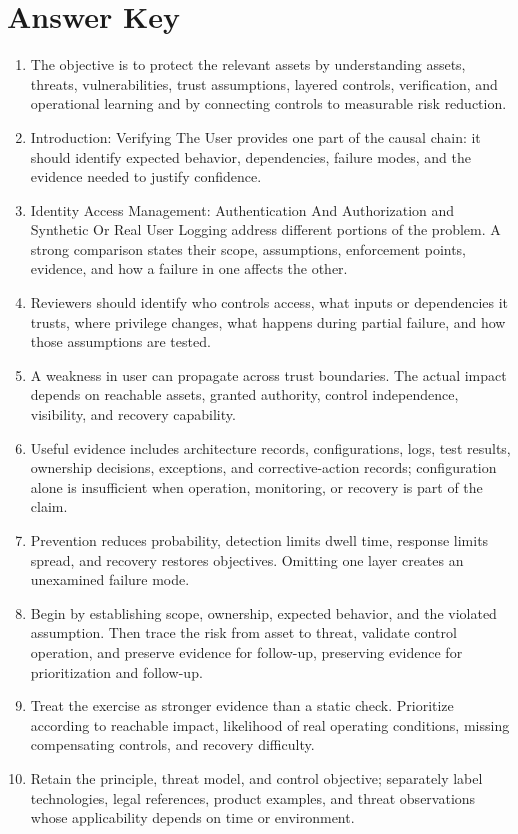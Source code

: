 \documentclass[11pt]{article}
\begin{document}
\section*{Answer Key}
\begin{enumerate}
\item The objective is to protect the relevant assets by understanding assets, threats, vulnerabilities, trust assumptions, layered controls, verification, and operational learning and by connecting controls to measurable risk reduction.
\item Introduction: Verifying The User provides one part of the causal chain: it should identify expected behavior, dependencies, failure modes, and the evidence needed to justify confidence.
\item Identity Access Management: Authentication And Authorization and Synthetic Or Real User Logging address different portions of the problem. A strong comparison states their scope, assumptions, enforcement points, evidence, and how a failure in one affects the other.
\item Reviewers should identify who controls access, what inputs or dependencies it trusts, where privilege changes, what happens during partial failure, and how those assumptions are tested.
\item A weakness in user can propagate across trust boundaries. The actual impact depends on reachable assets, granted authority, control independence, visibility, and recovery capability.
\item Useful evidence includes architecture records, configurations, logs, test results, ownership decisions, exceptions, and corrective-action records; configuration alone is insufficient when operation, monitoring, or recovery is part of the claim.
\item Prevention reduces probability, detection limits dwell time, response limits spread, and recovery restores objectives. Omitting one layer creates an unexamined failure mode.
\item Begin by establishing scope, ownership, expected behavior, and the violated assumption. Then trace the risk from asset to threat, validate control operation, and preserve evidence for follow-up, preserving evidence for prioritization and follow-up.
\item Treat the exercise as stronger evidence than a static check. Prioritize according to reachable impact, likelihood of real operating conditions, missing compensating controls, and recovery difficulty.
\item Retain the principle, threat model, and control objective; separately label technologies, legal references, product examples, and threat observations whose applicability depends on time or environment.
\end{enumerate}
\end{document}
